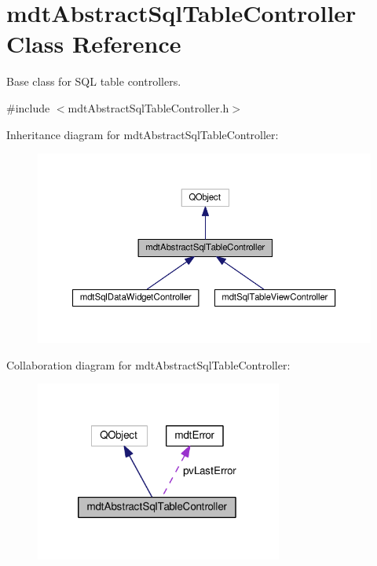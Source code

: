 \hypertarget{classmdt_abstract_sql_table_controller}{\section{mdt\-Abstract\-Sql\-Table\-Controller Class Reference}
\label{classmdt_abstract_sql_table_controller}
}


Base class for S\-Q\-L table controllers.  




{\ttfamily \#include $<$mdt\-Abstract\-Sql\-Table\-Controller.\-h$>$}



Inheritance diagram for mdt\-Abstract\-Sql\-Table\-Controller\-:
\nopagebreak
\begin{figure}[H]
\begin{center}
\leavevmode
\includegraphics[width=350pt]{classmdt_abstract_sql_table_controller__inherit__graph}
\end{center}
\end{figure}


Collaboration diagram for mdt\-Abstract\-Sql\-Table\-Controller\-:
\nopagebreak
\begin{figure}[H]
\begin{center}
\leavevmode
\includegraphics[width=230pt]{classmdt_abstract_sql_table_controller__coll__graph}
\end{center}
\end{figure}
